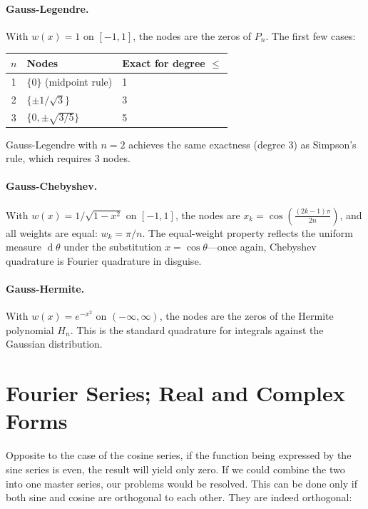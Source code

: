 \documentclass[12pt,a4paper]{report}
\DeclareMathOperator{\deriv}{d}
\theoremstyle{thms}
\theoremstyle{defns}
\begin{document}
\paragraph{Gauss-Legendre.} With $w(x) = 1$ on $[-1, 1]$, the nodes are the zeros of $P_n$. The first few cases:
\begin{center}
    \begin{tabular}{c l l}
        \hline
        $n$ & Nodes & Exact for degree $\leq$ \\
        \hline
        1 & $\{0\}$ (midpoint rule) & 1 \\
        2 & $\{\pm 1/\sqrt{3}\}$ & 3 \\
        3 & $\{0, \pm\sqrt{3/5}\}$ & 5 \\
        \hline
    \end{tabular}
\end{center}
Gauss-Legendre with $n = 2$ achieves the same exactness (degree 3) as Simpson's rule, which requires 3 nodes.

\paragraph{Gauss-Chebyshev.} With $w(x) = 1/\sqrt{1-x^2}$ on $[-1, 1]$, the nodes are $x_k = \cos\left(\frac{(2k-1)\pi}{2n}\right)$, and all weights are equal: $w_k = \pi/n$. The equal-weight property reflects the uniform measure $\deriv\theta$ under the substitution $x = \cos\theta$—once again, Chebyshev quadrature is Fourier quadrature in disguise.

\paragraph{Gauss-Hermite.} With $w(x) = e^{-x^2}$ on $(-\infty, \infty)$, the nodes are the zeros of the Hermite polynomial $H_n$. This is the standard quadrature for integrals against the Gaussian distribution.


\section{Fourier Series; Real and Complex Forms}

Opposite to the case of the cosine series, if the function being expressed by the sine series is even, the result will yield only zero. If we could combine the two into one master series, our problems would be resolved. This can be done only if both sine and cosine are orthogonal to each other. They are indeed orthogonal:
\end{document}
